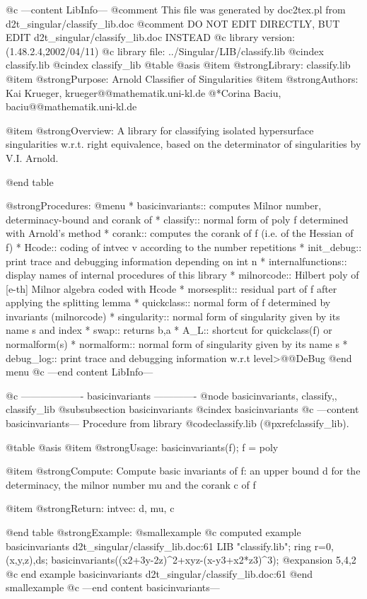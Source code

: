 @c ---content LibInfo---
@comment This file was generated by doc2tex.pl from d2t_singular/classify_lib.doc
@comment DO NOT EDIT DIRECTLY, BUT EDIT d2t_singular/classify_lib.doc INSTEAD
@c library version: (1.48.2.4,2002/04/11)
@c library file: ../Singular/LIB/classify.lib
@cindex classify.lib
@cindex classify_lib
@table @asis
@item @strong{Library:}
classify.lib
@item @strong{Purpose:}
  Arnold Classifier of Singularities
@item @strong{Authors:}
Kai Krueger, krueger@@mathematik.uni-kl.de
@*Corina Baciu, baciu@@mathematik.uni-kl.de

@item @strong{Overview:}
A library for classifying isolated hypersurface singularities w.r.t. right
equivalence, based on the determinator of singularities by V.I. Arnold.

@end table

@strong{Procedures:}
@menu
* basicinvariants:: computes Milnor number, determinacy-bound and corank of
* classify:: normal form of poly f determined with Arnold's method
* corank:: computes the corank of f (i.e. of the Hessian of f)
* Hcode:: coding of intvec v according to the number repetitions
* init_debug:: print trace and debugging information depending on int n
* internalfunctions:: display names of internal procedures of this library
* milnorcode:: Hilbert poly of [e-th] Milnor algebra coded with Hcode
* morsesplit:: residual part of f after applying the splitting lemma
* quickclass:: normal form of f determined by invariants (milnorcode)
* singularity:: normal form of singularity given by its name s and index
* swap:: returns b,a
* A_L:: shortcut for quickclass(f) or normalform(s)
* normalform:: normal form of singularity given by its name s
* debug_log:: print trace and debugging information w.r.t level>@@DeBug
@end menu
@c ---end content LibInfo---

@c ------------------- basicinvariants -------------
@node basicinvariants, classify,, classify_lib
@subsubsection basicinvariants
@cindex basicinvariants
@c ---content basicinvariants---
Procedure from library @code{classify.lib} (@pxref{classify_lib}).

@table @asis
@item @strong{Usage:}
basicinvariants(f); f = poly

@item @strong{Compute:}
Compute basic invariants of f: an upper bound d for the
determinacy, the milnor number mu and the corank c of f

@item @strong{Return:}
intvec: d, mu, c

@end table
@strong{Example:}
@smallexample
@c computed example basicinvariants d2t_singular/classify_lib.doc:61 
LIB "classify.lib";
ring r=0,(x,y,z),ds;
basicinvariants((x2+3y-2z)^2+xyz-(x-y3+x2*z3)^3);
@expansion{} 5,4,2
@c end example basicinvariants d2t_singular/classify_lib.doc:61
@end smallexample
@c ---end content basicinvariants---

